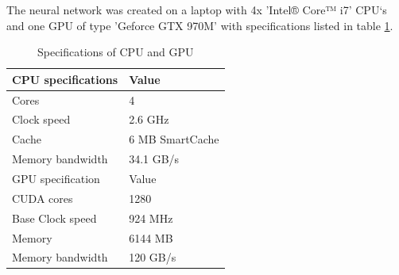 
\noindent
The neural network was created on a laptop with 4x 'Intel® Core™ i7' CPU‘s and one GPU of type 'Geforce GTX 970M' with specifications listed in table \ref{tab:Specs}.


\begin{table}[H]
\centering
\begin{tabular}{p{4cm}|p{4cm}}
\hline
CPU specifications &  Value \\ \hline
Cores & 4 \\
Clock speed & 2.6 GHz \\ 
Cache & 6 MB SmartCache  \\ 
Memory bandwidth & 34.1 GB/s \\ \hline
GPU specification & Value \\ \hline
CUDA cores & 1280  \\
Base Clock speed & 924 MHz  \\
Memory & 6144 MB  \\
Memory bandwidth & 120 GB/s  \\ \hline
\end{tabular}
\label{tab:Specs}
\caption{Specifications of CPU and GPU \citep{Intel,Nvidia}}
\end{table}

